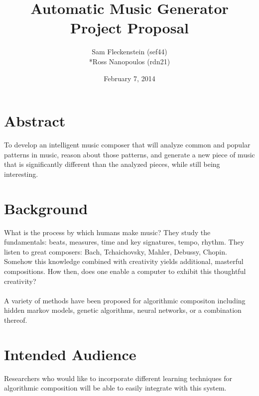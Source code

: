 \documentclass{article}
\begin{document}
\clearpage
{}
\begin{center}
\begin{minipage}{.6\textwidth}

\title{Automatic Music Generator \\ \vspace{2 pt} \Large{Project Proposal}}
\author{Sam Fleckenstein (sef44)\\*Ross Nanopoulos (rdn21)}
\date{February 7, 2014}
\maketitle

\end{minipage}
\end{center}
\clearpage

\tableofcontents
\newpage

\section{Abstract}
To develop an intelligent music composer that will analyze common and popular patterns in music, reason about those patterns, and generate a new piece of music that is significantly different than the analyzed pieces, while still being interesting.

\section{Background}
What is the process by which humans make music?  They study the fundamentals: beats, measures, time and key signatures, tempo, rhythm.  They listen to great composers: Bach, Tchaichovsky, Mahler, Debussy, Chopin.  Somehow this knowledge combined with creativity yields additional, masterful compositions.  How then, does one enable a computer to exhibit this thoughtful creativity?
\\
\\
A variety of methods have been proposed for algorithmic compositon including hidden markov models, genetic algorithms, neural networks, or a combination thereof.

\section{Intended Audience}
Researchers who would like to incorporate different learning techniques for algorithmic composition will be able to easily integrate with this system.
\end{document}
